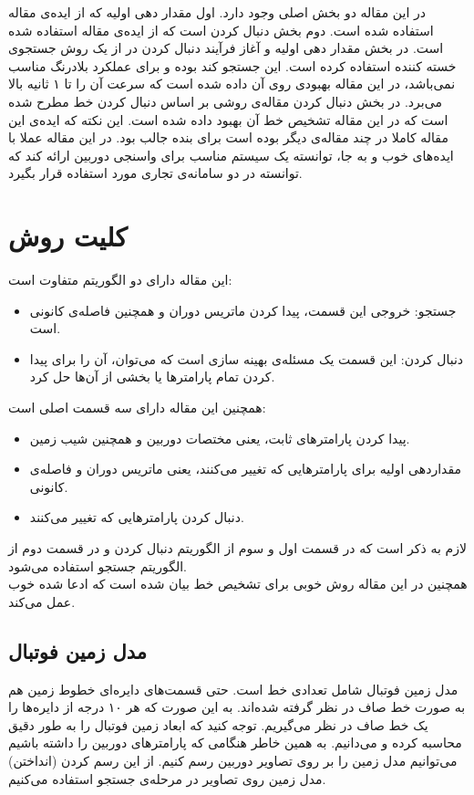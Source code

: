 \documentclass{report}
\begin{document}
در این مقاله دو بخش اصلی وجود دارد. اول مقدار دهی اولیه  که از ایده‌ی مقاله \cite{ct16} استفاده شده است. دوم بخش دنبال کردن است که از ایده‌ی مقاله \cite{ct15} استفاده شده است. در بخش مقدار دهی اولیه و آغاز فرآیند دنبال کردن در \cite{ct16} از یک روش جستجوی خسته کننده  استفاده کرده است. این جستجو کند بوده و برای عملکرد بلادرنگ مناسب نمی‌باشد، در این مقاله بهبودی روی آن داده شده است که سرعت آن را تا ۱ ثانیه بالا می‌برد. در بخش دنبال کردن مقاله‌ی \cite{ct15} روشی بر اساس دنبال کردن خط مطرح شده است که در این مقاله تشخیص خط آن بهبود داده شده است.
این نکته که ایده‌ی این مقاله کاملا در چند مقاله‌ی دیگر بوده است برای بنده جالب بود. در این مقاله عملا با ایده‌های خوب و به جا، توانسته یک سیستم مناسب برای واسنجی دوربین ارائه کند که توانسته در دو سامانه‌ی تجاری مورد استفاده قرار بگیرد.
\section{کلیت روش}
این مقاله دارای دو الگوریتم متفاوت است:
\begin{itemize}
\item
جستجو: خروجی این قسمت، پیدا کردن ماتریس دوران و همچنین فاصله‌ی کانونی است.
\item
دنبال کردن: این قسمت یک مسئله‌ی بهینه سازی است که می‌توان، آن را برای پیدا کردن تمام پارامترها یا بخشی از آن‌ها حل کرد.
\end{itemize}
همچنین این مقاله دارای سه قسمت اصلی است:
\begin{itemize}
\item
پیدا کردن پارامترهای ثابت، یعنی مختصات دوربین و همچنین شیب زمین.
\item
مقداردهی اولیه برای پارامترهایی که تغییر می‌کنند، یعنی ماتریس دوران و فاصله‌ی کانونی.
\item
دنبال کردن پارامترهایی که تغییر می‌کنند.
\end{itemize}
لازم به ذکر است که در قسمت اول و سوم از الگوریتم دنبال کردن و در قسمت دوم از الگوریتم جستجو استفاده می‌شود.
\\
همچنین در این مقاله روش خوبی برای تشخیص خط بیان شده است که ادعا شده خوب عمل می‌کند.
\subsection{مدل زمین فوتبال}
مدل زمین فوتبال شامل تعدادی خط است. حتی قسمت‌های دایر‌ه‌ای خطوط زمین هم به صورت خط صاف در نظر گرفته شده‌اند. به این صورت که هر ۱۰ درجه از دایره‌ها را یک خط صاف در نظر می‌گیریم. توجه کنید که ابعاد زمین فوتبال را به طور دقیق محاسبه کرده‌ و می‌دانیم. به همین خاطر هنگامی که پارامترهای دوربین را داشته باشیم می‌توانیم مدل زمین را بر روی تصاویر دوربین رسم کنیم. از این رسم کردن (انداختن) مدل زمین روی تصاویر در مرحله‌ی جستجو استفاده می‌کنیم.
\end{document}
